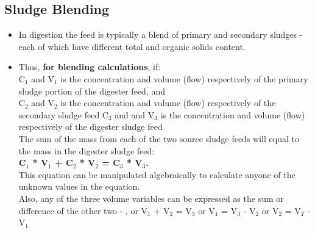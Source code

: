 \subsection{Sludge Blending} 

\begin{itemize}
\item In digestion the feed is typically a blend of primary and secondary sludges - each of which have different total and organic solids content.

\item Thus, \textbf{for blending calculations}, if:\\

C$_1$ and V$_1$ is the concentration and volume (flow) respectively of the primary sludge portion of the digester feed, and\\
 \vspace{0.2cm}
 C$_2$ and V$_2$ is the concentration and volume (flow) respectively of the secondary sludge feed 
 \vspace{0.2cm}
C$_3$ and and V$_3$ is the concentration and volume (flow) respectively of the digester sludge feed\\
\vspace{0.3cm}
The sum of the mass from each of the two source sludge feeds will equal to the mass in the digester sludge feed:\\
\vspace{0.3cm}
\textbf{C$_1$ * V$_1$ + C$_2$ * V$_2$ =  C$_3$ * V$_3$.}\\
\vspace{0.3cm}
This equation can be manipulated algebraically to calculate anyone of the unknown values in the equation.\\
\vspace{0.2cm}
Also, any of the three volume variables can be expressed as the sum or difference of the other two - , or V$_1$ + V$_2$ = V$_3$ or V$_1$ = V$_3$ - V$_2$ or V$_2$ = V$_T$ - V$_1$\\

\end{itemize}

